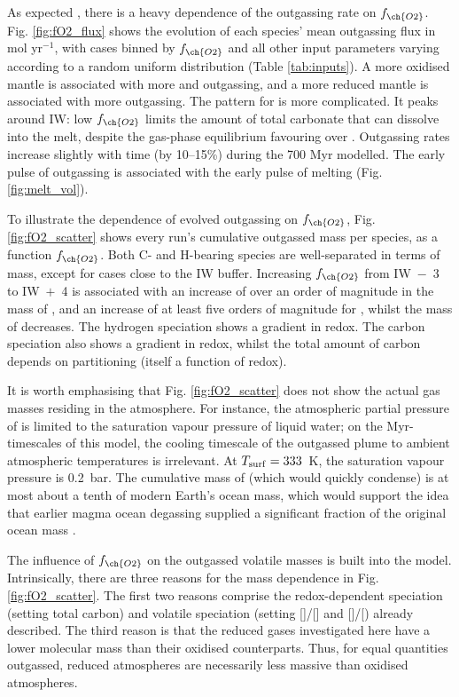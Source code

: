 As expected \citep{Holland1984, kasting_mantle_1993}, there is a heavy dependence of the outgassing rate on $f_{\ch{O2}}$. Fig. \ref{fig:fO2_flux} shows the evolution of each species' mean outgassing flux in mol yr$^{-1}$, with cases binned by $f_{\ch{O2}}$ and all other input parameters varying according to a random uniform distribution (Table \ref{tab:inputs}). A more oxidised mantle is associated with more  and  outgassing, and a more reduced mantle is associated with more  outgassing. The pattern for  is more complicated. It peaks around IW: low $f_{\ch{O2}}$ limits the amount of total carbonate that can dissolve into the melt, despite the gas-phase equilibrium favouring  over . Outgassing rates increase slightly with time (by 10--15\%) during the 700 Myr modelled. The early pulse of outgassing is associated with the early pulse of melting (Fig. \ref{fig:melt_vol}). 





To illustrate the dependence of evolved outgassing on $f_{\ch{O2}}$, Fig. \ref{fig:fO2_scatter} shows every run's cumulative outgassed mass per species, as a function $f_{\ch{O2}}$. Both C- and H-bearing species are well-separated in terms of mass, except for cases close to the IW buffer. Increasing $f_{\ch{O2}}$ from IW~$-$~3 to IW~$+$~4 is associated with an increase of over an order of magnitude in the mass of , and an increase of at least five orders of magnitude for , whilst the mass of  decreases. The hydrogen speciation shows a gradient in redox. The carbon speciation also shows a gradient in redox, whilst the total amount of carbon depends on partitioning (itself a function of redox).

It is worth emphasising that Fig. \ref{fig:fO2_scatter} does not show the actual gas masses residing in the atmosphere. For instance, the atmospheric partial pressure of  is limited to the saturation vapour pressure of liquid water; on the Myr-timescales of this model, the cooling timescale of the outgassed plume to ambient atmospheric temperatures is irrelevant. At $T_{\rm surf} = 333$~K, the saturation vapour pressure is 0.2~bar. The cumulative mass of  (which would quickly condense) is at most about a tenth of modern Earth's ocean mass, which would support the idea that earlier magma ocean degassing supplied a significant fraction of the original ocean mass \citep{Pahlevan2019}.

The influence of $f_{\ch{O2}}$ on the outgassed volatile masses is built into the model. Intrinsically, there are three reasons for the mass dependence in Fig. \ref{fig:fO2_scatter}. The first two reasons comprise the redox-dependent speciation (setting total carbon) and volatile speciation (setting []/[] and []/[\ch{CO]}) already described. The third reason is that the reduced gases investigated here have a lower molecular mass than their oxidised counterparts. Thus, for equal quantities outgassed, reduced atmospheres are necessarily less massive than oxidised atmospheres. 




